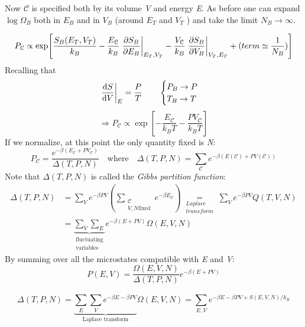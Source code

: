 \documentclass[../main/main.tex]{subfiles}
\begin{document}
\begin{remark}
Now \( \mathcal{C} \) is specified both by its volume \emph{V} and energy \emph{E}. As before one can expand \( \log \Omega _B   \)   both in \( E_B \) and in \( V_B \) (around \( E_T \) and \( V_T \)  ) and take the limit \( N_B \rightarrow \infty  \).
\end{remark}
\begin{equation}
  P_{\mathcal{C}} \propto \exp[ \frac{S_B (E_T,V_T)}{k_B}- \frac{E_{\mathcal{C}}}{k_B} \eval{\pdv{S_B}{E_B}}_{E_T,V_T} - \frac{V_{\mathcal{C}}}{k_B} \eval{\pdv{S_B}{V_B}}_{V_T,E_T} + (term \simeq \frac{1}{N_B})]
\end{equation}
Recalling that
\begin{equation}
  \eval{\dv{S}{V} }_E = \frac{P}{T} \qquad \begin{cases}
    P_B \rightarrow P \\ T_B \rightarrow T
\end{cases}
\end{equation}
\begin{equation}
  \Rightarrow P_{\mathcal{C}} \propto \exp [-\frac{E_{\mathcal{C}}}{k_B T} - \frac{P V_{\mathcal{C}}}{k_B T}]
\end{equation}
If we normalize, at this point the only quantity fixed is \emph{N}:
\begin{equation}
  P_{\mathcal{C}} = \frac{e^{-\beta (E_{\mathcal{C}}+P V_{\mathcal{C}})}}{\Delta (T,P,N)} \quad \text{where} \quad \Delta (T,P,N) = \sum_{\mathcal{C}}^{} e^{-\beta (E (\mathcal{C})+P V (\mathcal{C}))}
\end{equation}
Note that \( \Delta (T,P,N) \) is called the \emph{Gibbs partition function}:
\begin{equation}
\begin{split}
\Delta (T,P,N)  &=  \sum_{V}^{} e^{-\beta PV } (\sum_{\substack{ \mathcal{C} \\ V,N \text{fixed}} }^{} e^{-\beta E_{\mathcal{C}}}  ) \underset{\substack{Laplace \\ transform } }{=}  \sum_{V}^{} e^{-\beta PV} Q (T,V,N)       \\
& = \underbrace{\sum_{V}^{} \sum_{E}^{}}_{\substack{ \text{fluctuating} \\  \text{variables} } }  e^{-\beta (E+PV)} \Omega (E,V,N)
\end{split}
\end{equation}
By summing over all the microstates compatible with \emph{E} and \emph{V}:
\begin{equation}
  P (E,V) = \frac{\Omega (E,V,N)}{\Delta (T,P,N)} e^{-\beta (E+PV)}
\end{equation}
\begin{remark}
\begin{equation}
  \Delta (T,P,N) = \underbrace{ \sum_{E}^{} \sum_{V}^{} e^{-\beta E - \beta PV}}_{\text{Laplace transform}} \Omega (E,V,N) = \sum_{E,V}^{} e^{-\beta E- \beta PV + S(E,V,N)/k_B}
\end{equation}
\end{remark}
\end{document}
